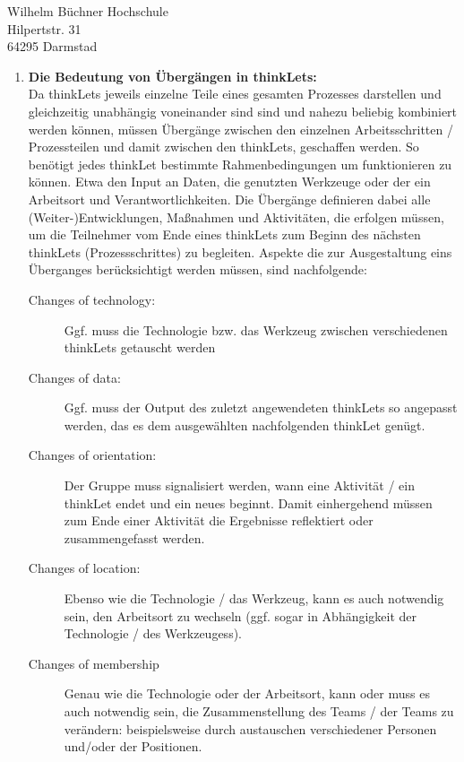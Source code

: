 \documentclass[
    version=last,           %
    DIV=13,                 %
    BCOR=0mm,               %
    paper=a4,               %
    fontsize=12pt,          %
    firsthead=on,           %
    firstfoot=on,           %
    pagenumber=on,i         %
    parskip=half,           %
    enlargefirstpage=,      %
    firsthead=on,           %
    fromrule=afteraddress,  %
    priority=off,           %
    backaddress=true,       %
    refline=dateright,      %
	fromalign=right,	    %
    fromemail=on,i          %
    fromurl=on,             %
    frombank=on,
    fromphone=on,           %
    frommobilephone=on      %
    fromlogo=on,            %
    addrfield=on,           %
    subject=untitled,  %
    foldmarks=off,          %
    numericaldate=off,      %
	pagenumber=right,	        %
	parskip=half,	        %
    headsep=false,          %
    footsepline=true,       %
    foldmarks=off,		    %
	]{scrlttr2}
\begin{document}
\begin{letter} {Wilhelm Büchner Hochschule \\
Hilpertstr. 31\\
64295 Darmstad}
\begin{itemize}
\begin{enumerate}
            \vspace{1cm}
        \item \textbf{Die Bedeutung von Übergängen in thinkLets: } \\
            Da thinkLets jeweils einzelne Teile eines gesamten Prozesses
            darstellen und gleichzeitig unabhängig voneinander sind sind und
            nahezu beliebig kombiniert
            werden können, müssen Übergänge zwischen den einzelnen
            Arbeitsschritten / Prozessteilen und damit zwischen den thinkLets,
            geschaffen werden. So benötigt jedes thinkLet bestimmte
            Rahmenbedingungen um funktionieren zu können. Etwa den Input an
            Daten, die genutzten Werkzeuge oder der ein Arbeitsort und
            Verantwortlichkeiten. Die Übergänge definieren dabei alle
            (Weiter-)Entwicklungen, Maßnahmen und Aktivitäten, die erfolgen
            müssen, um die Teilnehmer vom Ende eines thinkLets zum Beginn des
            nächsten thinkLets (Prozessschrittes) zu begleiten. Aspekte
            die zur Ausgestaltung eins Überganges berücksichtigt werden
            müssen, sind nachfolgende:
            \begin{description}
                \item [ Changes of technology: ]
                    Ggf. muss die Technologie bzw. das Werkzeug zwischen
                    verschiedenen thinkLets getauscht werden
                \item [ Changes of data: ]
                    Ggf. muss der Output des zuletzt angewendeten thinkLets so
                    angepasst werden, das es dem ausgewählten nachfolgenden
                    thinkLet genügt.
                \item [ Changes of orientation: ]
                    Der Gruppe muss signalisiert werden, wann eine Aktivität /
                    ein thinkLet endet und ein neues beginnt. Damit einhergehend
                    müssen zum Ende einer Aktivität die Ergebnisse reflektiert
                    oder zusammengefasst werden.
                \item [ Changes of location: ]
                    Ebenso wie die Technologie / das Werkzeug,
                    kann es auch notwendig sein, den Arbeitsort zu wechseln
                    (ggf. sogar in Abhängigkeit der Technologie / des Werkzeugess).
                \item [ Changes of membership ] Genau wie die Technologie oder
                    der Arbeitsort, kann oder muss es auch notwendig sein, die
                    Zusammenstellung des Teams / der Teams zu verändern:
                    beispielsweise durch austauschen verschiedener Personen
                    und/oder der Positionen.
            \end{description}



\end{enumerate}
\end{itemize}
\end{letter}
\end{document}
